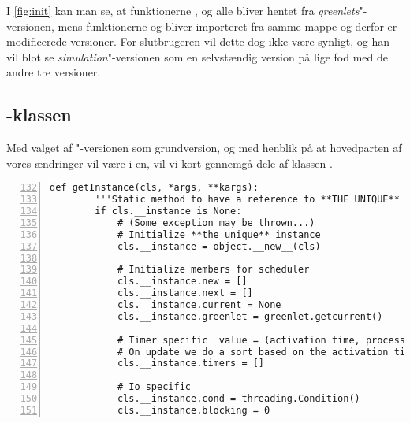 I \cref{fig:init} kan man se, at funktionerne ,  og  alle bliver hentet fra \emph{greenlets}"-versionen, mens funktionerne  og  bliver importeret fra samme mappe og derfor er modificerede versioner. For slutbrugeren  vil dette dog ikke være synligt, og han vil blot se \emph{simulation}"-versionen som en selvstændig version på lige fod med de andre tre versioner.

\subsection{-klassen}
\label{sec:scheduler}
Med valget af "-versionen som grundversion, og med henblik på at hovedparten af vores ændringer vil være i \sched en, vil vi kort gennemgå dele af klassen .

\begin{lstlisting}[firstnumber=132,stepnumber=5,numbers=left, float, label=fig:scheduling, caption=Uddrag af Scheduler.py i \emph{greenlets}versionen.]
    def getInstance(cls, *args, **kargs):
        '''Static method to have a reference to **THE UNIQUE** instance'''
        if cls.__instance is None:
            # (Some exception may be thrown...)
            # Initialize **the unique** instance
            cls.__instance = object.__new__(cls)

            # Initialize members for scheduler
            cls.__instance.new = []
            cls.__instance.next = []
            cls.__instance.current = None
            cls.__instance.greenlet = greenlet.getcurrent()

            # Timer specific  value = (activation time, process)
            # On update we do a sort based on the activation time
            cls.__instance.timers = []

            # Io specific
            cls.__instance.cond = threading.Condition()
            cls.__instance.blocking = 0
\end{lstlisting}

